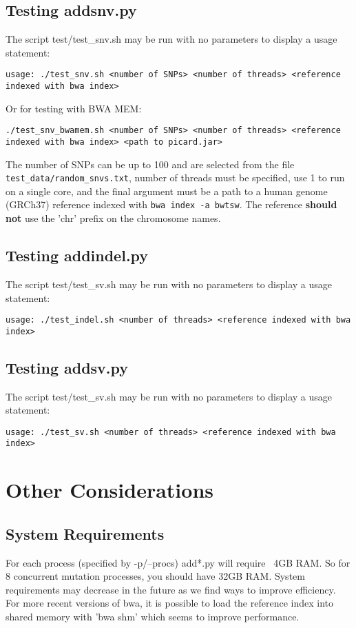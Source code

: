 \documentclass[letterpaper,11pt]{article}
\begin{document}
\subsection{Testing addsnv.py}
The script {test/test\_snv.sh} may be run with no parameters to display a usage statement:
\begin{verbatim}
usage: ./test_snv.sh <number of SNPs> <number of threads> <reference indexed with bwa index>
\end{verbatim}
Or for testing with BWA MEM:
\begin{verbatim}
./test_snv_bwamem.sh <number of SNPs> <number of threads> <reference indexed with bwa index> <path to picard.jar>
\end{verbatim}

The number of SNPs can be up to 100 and are selected from the file \texttt{test\_data/random\_snvs.txt}, number of threads must be specified, use 1 to run on a single core, and the final argument must be a path to a human genome (GRCh37) reference indexed with \texttt{bwa index -a bwtsw}. The reference \textbf{should not} use the 'chr' prefix on the chromosome names.

\subsection{Testing addindel.py}
The script {test/test\_sv.sh} may be run with no parameters to display a usage statement:
\begin{verbatim}
usage: ./test_indel.sh <number of threads> <reference indexed with bwa index>
\end{verbatim}

\subsection{Testing addsv.py}
The script {test/test\_sv.sh} may be run with no parameters to display a usage statement:
\begin{verbatim}
usage: ./test_sv.sh <number of threads> <reference indexed with bwa index>
\end{verbatim}



\section{Other Considerations}
\subsection{System Requirements}
For each process (specified by -p/--procs) add*.py will require ~4GB RAM. So for 8 concurrent mutation processes, you should have 32GB RAM. System requirements may decrease in the future as we find ways to improve efficiency. For more recent versions of bwa, it is possible to load the reference index into shared memory with 'bwa shm' which seems to improve performance.
\end{document}
